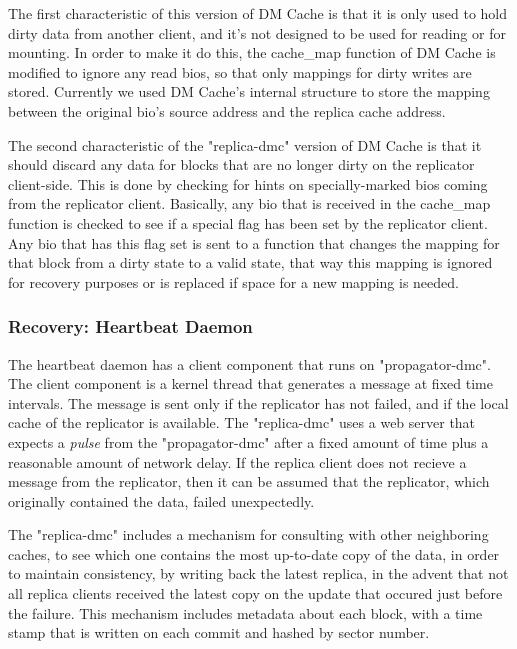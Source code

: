 The first characteristic of this version of DM Cache is
that it is only used to hold dirty data from another client, 
and it's not designed to be used for reading or for 
mounting. In order to make it do this, the cache\_map
function of DM Cache is modified to ignore any read bios,
so that only mappings for dirty writes are stored. 
Currently we used DM Cache's internal structure to store
the mapping between the original bio's source address
and the replica cache address.


The second characteristic of the "replica-dmc" version of
DM Cache is that it should discard any data for blocks
that are no longer dirty on the replicator client-side.
This is done by checking for hints on specially-marked bios
coming from the replicator client. Basically, any bio that
is received in the cache\_map function is checked to see
if a special flag has been set by the replicator client. 
Any bio that has this flag set is sent to a function that 
changes the mapping for that block from a dirty state to 
a valid state, that way this mapping is ignored for 
recovery purposes or is replaced if space for a new mapping
is needed.


\subsubsection{ Recovery: Heartbeat Daemon}

The heartbeat daemon has a client component that runs on
"propagator-dmc". The client component is a kernel thread
that generates a message at fixed time intervals. The
message is sent only if the replicator has not failed, and
if the local cache of the replicator is available. The
"replica-dmc" uses a web server that expects a \textit{pulse}
from the "propagator-dmc" after a fixed amount of time plus
a reasonable amount of network delay. If the replica client
does not recieve a message from the replicator, then it can
be assumed that the replicator, which originally contained
the data, failed unexpectedly.

The "replica-dmc" includes a mechanism for consulting with
other neighboring caches, to see which one contains the 
most up-to-date copy of the data, in order to maintain
consistency, by writing back the latest replica, in the advent
that not all replica clients received the latest copy
on the update that occured just before the failure. This
mechanism includes metadata about each block, with a time
stamp that is written on each commit and hashed by sector
number.

